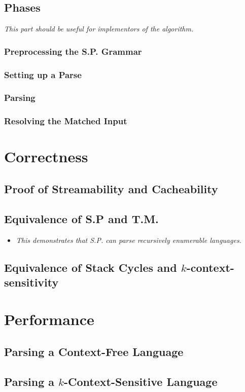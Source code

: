 \documentclass{article}
\begin{document}
\subsection{Phases}
\textit{This part should be useful for implementors of the algorithm.}
\subsubsection{Preprocessing the S.P. Grammar}
\subsubsection{Setting up a Parse}
\subsubsection{Parsing}
\subsubsection{Resolving the Matched Input}

\section{Correctness}
\subsection{Proof of Streamability and Cacheability}
\subsection{Equivalence of S.P and T.M.}
\begin{itemize}
  \item \textit{This demonstrates that S.P. can parse recursively enumerable languages.}
\end{itemize}
\subsection{Equivalence of Stack Cycles and $k$-context-sensitivity}

\section{Performance}
\subsection{Parsing a Context-Free Language}
\subsection{Parsing a $k$-Context-Sensitive Language}
\end{document}
